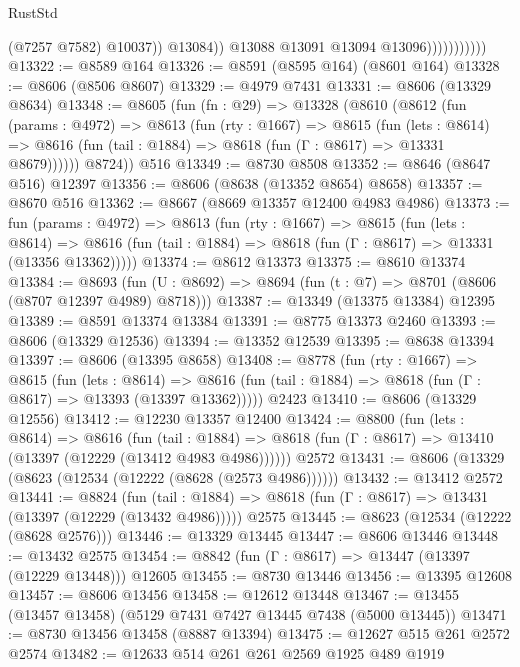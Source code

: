 \begin{lexlean}{RustStd}
\begin{coremodule}
                                  (@7257 @7582)
                                  @10037))
                              @13084))
                          @13088
                          @13091
                          @13094
                          @13096)))))))))))
@13322 := @8589 @164
@13326 := @8591 (@8595 @164) (@8601 @164)
@13328 := @8606 (@8506 @8607)
@13329 := @4979 @7431
@13331 := @8606 (@13329 @8634)
@13348 := @8605
    (fun (fn : @29) =>
    @13328
      (@8610
        (@8612
          (fun (params : @4972) =>
          @8613
            (fun (rty : @1667) =>
            @8615
              (fun (lets : @8614) =>
              @8616 (fun (tail : @1884) => @8618 (fun (Γ : @8617) => @13331 @8679))))))
        @8724))
    @516
@13349 := @8730 @8508
@13352 := @8646 (@8647 @516) @12397
@13356 := @8606 (@8638 (@13352 @8654) @8658)
@13357 := @8670 @516
@13362 := @8667 (@8669 @13357 @12400 @4983 @4986)
@13373 := fun (params : @4972) =>
  @8613
    (fun (rty : @1667) =>
    @8615
      (fun (lets : @8614) =>
      @8616 (fun (tail : @1884) => @8618 (fun (Γ : @8617) => @13331 (@13356 @13362)))))
@13374 := @8612 @13373
@13375 := @8610 @13374
@13384 := @8693
    (fun (U : @8692) => @8694 (fun (t : @7) => @8701 (@8606 (@8707 @12397 @4989) @8718)))
@13387 := @13349 (@13375 @13384) @12395
@13389 := @8591 @13374 @13384
@13391 := @8775 @13373 @2460
@13393 := @8606 (@13329 @12536)
@13394 := @13352 @12539
@13395 := @8638 @13394
@13397 := @8606 (@13395 @8658)
@13408 := @8778
    (fun (rty : @1667) =>
    @8615
      (fun (lets : @8614) =>
      @8616 (fun (tail : @1884) => @8618 (fun (Γ : @8617) => @13393 (@13397 @13362)))))
    @2423
@13410 := @8606 (@13329 @12556)
@13412 := @12230 @13357 @12400
@13424 := @8800
    (fun (lets : @8614) =>
    @8616
      (fun (tail : @1884) =>
      @8618 (fun (Γ : @8617) => @13410 (@13397 (@12229 (@13412 @4983 @4986))))))
    @2572
@13431 := @8606 (@13329 (@8623 (@12534 (@12222 (@8628 (@2573 @4986))))))
@13432 := @13412 @2572
@13441 := @8824
    (fun (tail : @1884) => @8618 (fun (Γ : @8617) => @13431 (@13397 (@12229 (@13432 @4986)))))
    @2575
@13445 := @8623 (@12534 (@12222 (@8628 @2576)))
@13446 := @13329 @13445
@13447 := @8606 @13446
@13448 := @13432 @2575
@13454 := @8842 (fun (Γ : @8617) => @13447 (@13397 (@12229 @13448))) @12605
@13455 := @8730 @13446
@13456 := @13395 @12608
@13457 := @8606 @13456
@13458 := @12612 @13448
@13467 := @13455 (@13457 @13458) (@5129 @7431 @7427 @13445 @7438 (@5000 @13445))
@13471 := @8730 @13456 @13458 (@8887 @13394)
@13475 := @12627 @515 @261 @2572 @2574
@13482 := @12633 @514 @261 @261 @2569 @1925 @489 @1919

\end{coremodule}
\end{lexlean}
